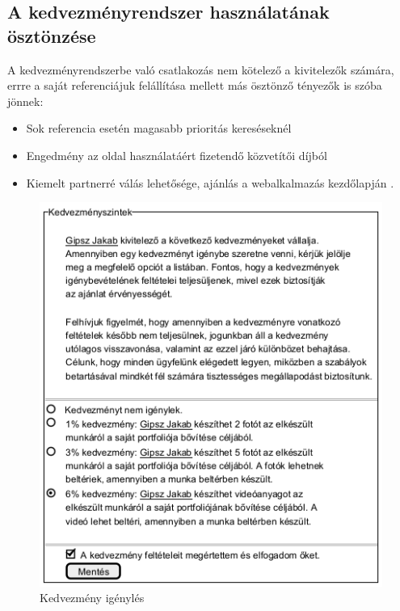 \subsection{A kedvezményrendszer használatának ösztönzése}
A kedvezményrendszerbe való csatlakozás nem kötelező a kivitelezők számára, errre a saját referenciájuk felállítása mellett más ösztönző tényezők is szóba jönnek:
\begin{itemize}
\item Sok referencia esetén magasabb prioritás kereséseknél 
\item Engedmény az oldal használatáért fizetendő közvetítői díjból 
\item Kiemelt partnerré válás lehetősége, ajánlás a webalkalmazás kezdőlapján .
\end{itemize} 

\begin{figure}[h]
	\centering
	\includegraphics[scale=0.5]{img/kedvezmeny.png}
	\caption*{Kedvezmény igénylés}
	\label{fig:kedvez}
\end{figure}
